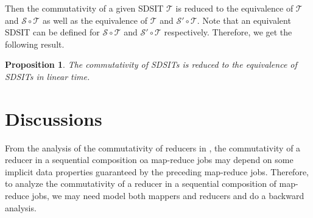 \documentclass[11pt]{article}
\newtheorem{proposition}[theorem]{Proposition}
\def\Ss{{\mathcal{S} }}
\def\Tt{{\mathcal{T} }}
\begin{document}
Then the commutativity of a given SDSIT $\Tt$ is reduced to the equivalence of $\Tt$ and $\Ss \circ \Tt$ as well as the equivalence of $\Tt$ and $\Ss'\circ \Tt$. Note that an equivalent SDSIT can be defined for $\Ss \circ \Tt$ and $\Ss' \circ \Tt$ respectively. Therefore, we get the following result.

\begin{proposition}
The commutativity of SDSITs is reduced to the equivalence of SDSITs in linear time.
\end{proposition}

\section{Discussions}

From the analysis of the commutativity of reducers in \cite{XZZ+14}, the commutativity of a reducer in a sequential composition oa map-reduce jobs may depend on some implicit data properties guaranteed by the preceding map-reduce jobs. Therefore, to analyze the commutativity of a reducer in a sequential composition of map-reduce jobs, we may need model both mappers and reducers and do a backward analysis.



\end{document}
